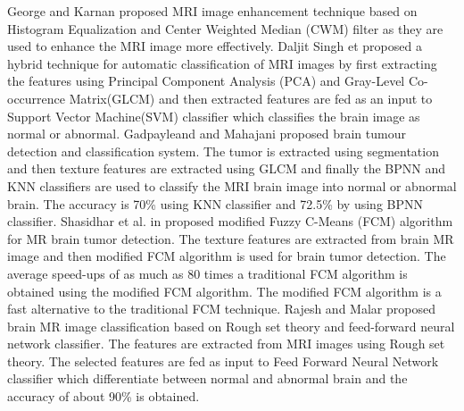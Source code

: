 	George and Karnan \cite{George2012MRIBI} proposed MRI image enhancement
	technique based on Histogram Equalization and Center Weighted Median (CWM)
	filter as they are used to enhance the MRI image more effectively. Daljit
	Singh et \cite{Funmilola2015ClassificationOA} proposed a hybrid technique
	for automatic classification of MRI images by first extracting the features
	using Principal Component Analysis (PCA) and Gray-Level Co-occurrence
	Matrix(GLCM) and then extracted features are fed as an input to Support
	Vector Machine(SVM) classifier which classifies the brain image as normal or
	abnormal. Gadpayleand and Mahajani \cite{9074375} proposed brain tumour
	detection and classification system. The tumor is extracted using
	segmentation and then texture features are extracted using GLCM and finally
	the BPNN and KNN classifiers are used to classify the MRI brain image into
	normal or abnormal brain. The accuracy is 70\% using KNN classifier and
	72.5\% by using BPNN classifier. Shasidhar et al. in \cite{article} proposed
	modified Fuzzy C-Means (FCM) algorithm for MR brain tumor detection. The
	texture features are extracted from brain MR image and then modified FCM
	algorithm is used for brain tumor detection. The average speed-ups of as
	much as 80 times a traditional FCM algorithm is obtained using the modified
	FCM algorithm. The modified FCM algorithm is a fast alternative to the
	traditional FCM technique.  Rajesh and Malar \cite{inproceedings} proposed
	brain MR image classification based on Rough set theory and feed-forward
	neural network classifier. The features are extracted from MRI images using
	Rough set theory. The selected features are fed as input to Feed Forward
	Neural Network classifier which differentiate between normal and abnormal
	brain and the accuracy of about 90\% is obtained.

